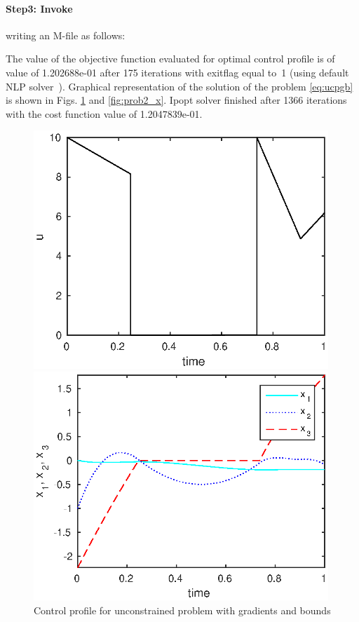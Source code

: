 \paragraph{Step3: Invoke~} writing an M-file
 as follows: 

{\small }

The value of the objective function evaluated for optimal control
profile is of value of 1.202688e-01 after 175 iterations with exitflag
equal to~1 (using default NLP solver~). Graphical
representation of the solution of the problem \eqref{eq:ucpgb} is
shown in Figs. \ref{fig:prob2_u} and \ref{fig:prob2_x}. Ipopt solver
finished after 1366 iterations with the cost function value of
1.2047839e-01. 

\begin{figure}[htb]
\begin{minipage}[t]{0.5\linewidth}
\centering
\includegraphics[width=0.99\textwidth]{examples/problem2/graphs/u_624a.eps}
\caption[Tutorial example 3: control profile]{Control profile for
  unconstrained problem with gradients and bounds} \label{fig:prob2_u} 
\end{minipage}
\begin{minipage}[t]{0.5\linewidth}
\centering
\includegraphics[width=0.99\textwidth]{examples/problem2/graphs/x13_624a.eps}

\end{minipage}
\end{figure}
